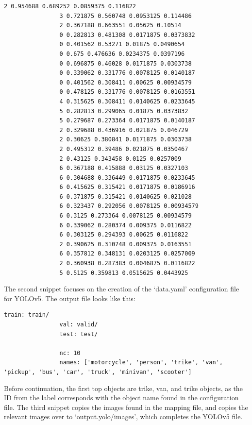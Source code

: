 \documentclass[12pt]{report} %
\begin{document}
			\begin{lstlisting}[tabsize=1]
				2 0.954688 0.689252 0.0859375 0.116822
				3 0.721875 0.560748 0.0953125 0.114486
				2 0.367188 0.663551 0.05625 0.10514
				0 0.282813 0.481308 0.0171875 0.0373832
				0 0.401562 0.53271 0.01875 0.0490654
				0 0.675 0.476636 0.0234375 0.0397196
				0 0.696875 0.46028 0.0171875 0.0303738
				0 0.339062 0.331776 0.0078125 0.0140187
				0 0.401562 0.308411 0.00625 0.00934579
				0 0.478125 0.331776 0.0078125 0.0163551
				4 0.315625 0.308411 0.0140625 0.0233645
				5 0.282813 0.299065 0.01875 0.0373832
				5 0.279687 0.273364 0.0171875 0.0140187
				2 0.329688 0.436916 0.021875 0.046729
				2 0.30625 0.380841 0.0171875 0.0303738
				2 0.495312 0.39486 0.021875 0.0350467
				2 0.43125 0.343458 0.0125 0.0257009
				6 0.367188 0.415888 0.03125 0.0327103
				6 0.304688 0.336449 0.0171875 0.0233645
				6 0.415625 0.315421 0.0171875 0.0186916
				6 0.371875 0.315421 0.0140625 0.021028
				6 0.323437 0.292056 0.0078125 0.00934579
				6 0.3125 0.273364 0.0078125 0.00934579
				6 0.339062 0.280374 0.009375 0.0116822
				6 0.303125 0.294393 0.00625 0.0116822
				2 0.390625 0.310748 0.009375 0.0163551
				6 0.357812 0.348131 0.0203125 0.0257009
				2 0.360938 0.287383 0.0046875 0.0116822
				5 0.5125 0.359813 0.0515625 0.0443925
			\end{lstlisting}
			
			
			The second snippet focuses on the creation of the `data.yaml' configuration file for YOLOv5. The output file looks like this:

			\begin{lstlisting}[tabsize=1]
				train: train/
				val: valid/
				test: test/

				nc: 10
				names: ['motorcycle', 'person', 'trike', 'van', 'pickup', 'bus', 'car', 'truck', 'minivan', 'scooter']
			\end{lstlisting}
		
			Before continuation, the first top objects are trike, van, and trike objects, as the ID from the label corresponds with the object name found in the configuration file. The third snippet copies the images found in the mapping file, and copies the relevant images over to `output.yolo/images', which completes the YOLOv5 file.
\end{document}

